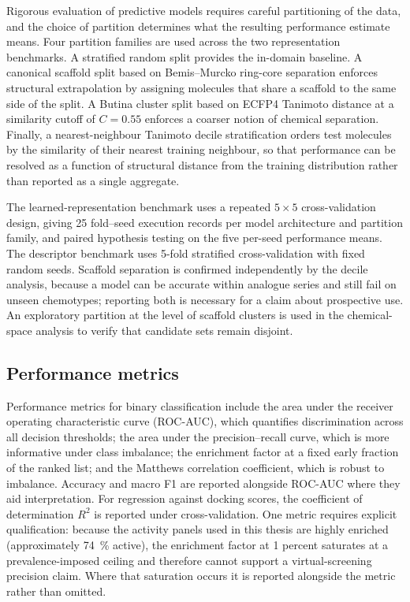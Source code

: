 Rigorous evaluation of predictive models requires careful partitioning of the data, and the choice of partition determines what the resulting performance estimate means. Four partition families are used across the two representation benchmarks. A stratified random split provides the in-domain baseline. A canonical scaffold split based on Bemis--Murcko ring-core separation enforces structural extrapolation by assigning molecules that share a scaffold to the same side of the split. A Butina cluster split based on ECFP4 Tanimoto distance at a similarity cutoff of $C = \num{0.55}$ enforces a coarser notion of chemical separation. Finally, a nearest-neighbour Tanimoto decile stratification orders test molecules by the similarity of their nearest training neighbour, so that performance can be resolved as a function of structural distance from the training distribution rather than reported as a single aggregate.

The learned-representation benchmark uses a repeated $5 \times 5$ cross-validation design, giving \num{25} fold--seed execution records per model architecture and partition family, and paired hypothesis testing on the five per-seed performance means. The descriptor benchmark uses 5-fold stratified cross-validation with fixed random seeds. Scaffold separation is confirmed independently by the decile analysis, because a model can be accurate within analogue series and still fail on unseen chemotypes; reporting both is necessary for a claim about prospective use. An exploratory partition at the level of scaffold clusters is used in the chemical-space analysis to verify that candidate sets remain disjoint.

\subsection{Performance metrics}

Performance metrics for binary classification include the area under the receiver operating characteristic curve (ROC-AUC), which quantifies discrimination across all decision thresholds; the area under the precision--recall curve, which is more informative under class imbalance; the enrichment factor at a fixed early fraction of the ranked list; and the Matthews correlation coefficient, which is robust to imbalance. Accuracy and macro F1 are reported alongside ROC-AUC where they aid interpretation. For regression against docking scores, the coefficient of determination $R^{2}$ is reported under cross-validation. One metric requires explicit qualification: because the activity panels used in this thesis are highly enriched (approximately \qty{74}{\percent} active), the enrichment factor at \num{1} percent saturates at a prevalence-imposed ceiling and therefore cannot support a virtual-screening precision claim. Where that saturation occurs it is reported alongside the metric rather than omitted.


